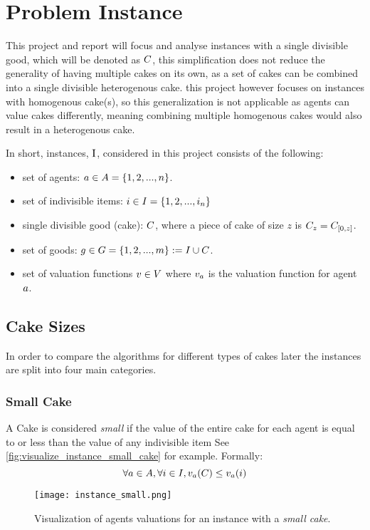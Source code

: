

\section{Problem Instance}
This project and report will focus and analyse instances with a single divisible good, which will be denoted as $C$, this simplification does not reduce the generality of having multiple cakes on its own, as a set of cakes can be combined into a single divisible heterogenous cake. this project however focuses on instances with homogenous cake(s), so this generalization is not applicable as agents can value cakes differently, meaning combining multiple homogenous cakes would also result in a heterogenous cake.

In short, instances, $\sInstance$, considered in this project consists of the following:
\begin{itemize}
    \item set of agents: $a\in A=\{1,2,...,n\}$.
    \item set of indivisible items: $i\in I=\{1,2,...,i_n\}$
    \item single divisible good (cake): $C$, where a piece of cake of size $z$ is $C_z=C_{[0,z]}$.
    \item set of goods: $g\in G=\{1,2,...,m\}:=I\cup C$.
    \item set of valuation functions $v \in V$ where $v_a$ is the valuation function for agent $a$.
\end{itemize}



\subsection{Cake Sizes}\label{subsec:cake-sizes}
In order to compare the algorithms for different types of cakes later the instances are split into four main categories. 

\subsubsection*{Small Cake}\label{subsubsec:small-cake}
A Cake is considered \textit{small} if the value of the entire cake for each agent is equal to or less than the value of any indivisible item See \autoref{fig:visualize_instance_small_cake} for example. Formally:
$$\forall a\in A, \forall i\in I, v_a(C)\leq v_a(i)$$
\begin{figure}
    \centering
    \texttt{[image: instance\_small.png]}
    \caption{Visualization of agents valuations for an instance with a \textit{small cake}.}
    \label{fig:visualize_instance_small_cake}
\end{figure}


